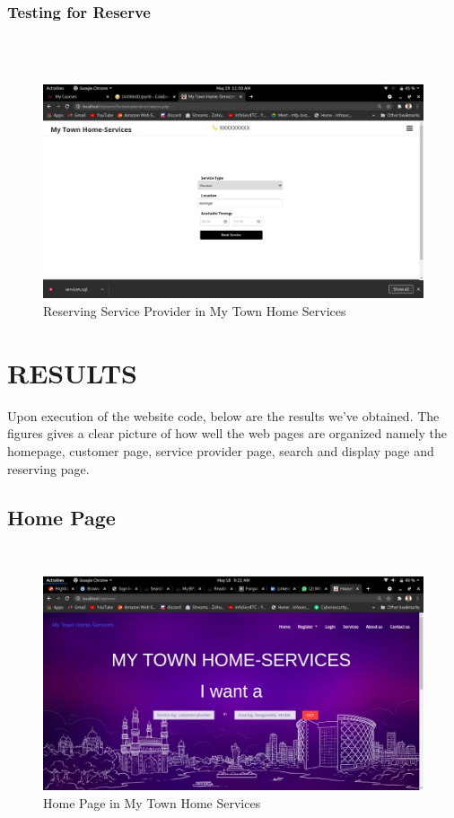 \documentclass[12pt,a4paper]{report}
\begin{document}
\begin{titlepage}
{{\subsection{ Testing for Reserve}\\ \\
\begin{figure}[h!]
	\begin{center}
		 \includegraphics[width=\linewidth]{reserve.jpeg}
	\end{center}
	\caption{Reserving Service Provider in My Town Home Services}
\end{figure}
\newpage
{\raggedright
\chapter{ RESULTS }
}
Upon execution of the website code, below are the results we've obtained. The figures gives a clear picture of how well the web pages are organized namely the homepage, customer page, service provider page, search and display page and reserving page.
\newpage
\section{ Home Page}\\ [3.0cm]
\vspace{0.30cm}
\begin{figure}[h!]
	\begin{center}
		 \includegraphics[width=1.0\linewidth,height=0.5\textheight]{home.jpeg}
	\end{center}
	\caption{Home Page in My Town Home Services}
\end{figure}
\newpage
{\raggedright
}}}
\end{titlepage}
\end{document}
